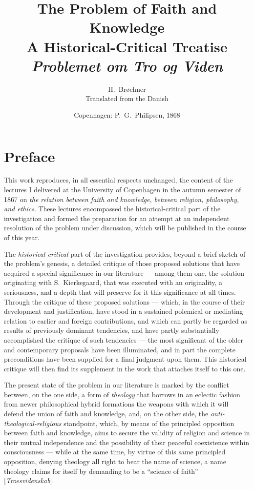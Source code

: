\documentclass[12pt,a4paper]{book}
\title{\textbf{The Problem of Faith and Knowledge}\\[6pt]
  \large A Historical-Critical Treatise\\[6pt]
  \normalsize\textit{Problemet om Tro og Viden}}
\author{H.\ Brøchner\\[4pt]
  \small Translated from the Danish}
\date{Copenhagen: P.\ G.\ Philipsen, 1868}
\begin{document}
\maketitle
\thispagestyle{empty}
\newpage

\tableofcontents
\newpage

\chapter*{Preface}
\label{ch:preface}

\noindent This work reproduces, in all essential respects unchanged,
the content of the lectures I delivered at the University of Copenhagen
in the autumn semester of 1867 on \emph{the relation between faith and
knowledge, between religion, philosophy, and ethics}. These lectures
encompassed the historical-critical part of the investigation and
formed the preparation for an attempt at an independent resolution of
the problem under discussion, which will be published in the course of
this year.

The \emph{historical-critical} part of the investigation provides, beyond a
brief sketch of the problem's genesis, a detailed critique of those
proposed solutions that have acquired a special significance in our
literature --- among them one, the solution originating with
S.\ Kierkegaard, that was executed with an originality, a seriousness,
and a depth that will preserve for it this significance at all times.
Through the critique of these proposed solutions --- which, in the
course of their development and justification, have stood in a
sustained polemical or mediating relation to earlier and foreign
contributions, and which can partly be regarded as results of
previously dominant tendencies, and have partly substantially
accomplished the critique of such tendencies --- the most significant
of the older and contemporary proposals have been illuminated, and in
part the complete preconditions have been supplied for a final judgment
upon them. This historical critique will then find its supplement in
the work that attaches itself to this one.

The present state of the problem in our literature is marked by the
conflict between, on the one side, a form of \emph{theology} that borrows in
an eclectic fashion from newer philosophical hybrid formations the
weapons with which it will defend the union of faith and knowledge,
and, on the other side, the \emph{anti-theological-religious} standpoint,
which, by means of the principled opposition between faith and
knowledge, aims to secure the validity of religion and science in
their mutual independence and the possibility of their peaceful
coexistence within consciousness --- while at the same time, by virtue
of this same principled opposition, denying theology all right to bear
the name of science, a name theology claims for itself by demanding to
be a ``science of faith'' [\textit{Troesvidenskab}].
\end{document}

